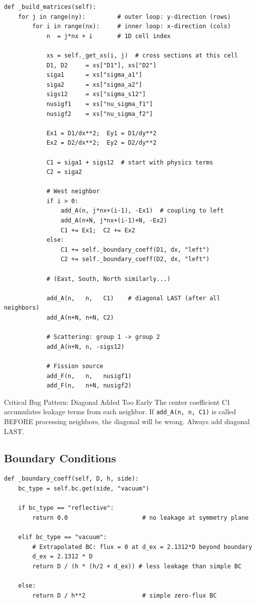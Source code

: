\documentclass[12pt,a4paper]{article}
\begin{document}
\begin{lstlisting}[caption={Matrix Assembly -- The Core of the Solver}]
def _build_matrices(self):
    for j in range(ny):         # outer loop: y-direction (rows)
        for i in range(nx):     # inner loop: x-direction (cols)
            n  = j*nx + i       # 1D cell index

            xs = self._get_xs(i, j)  # cross sections at this cell
            D1, D2     = xs["D1"], xs["D2"]
            siga1      = xs["sigma_a1"]
            siga2      = xs["sigma_a2"]
            sigs12     = xs["sigma_s12"]
            nusigf1    = xs["nu_sigma_f1"]
            nusigf2    = xs["nu_sigma_f2"]

            Ex1 = D1/dx**2;  Ey1 = D1/dy**2
            Ex2 = D2/dx**2;  Ey2 = D2/dy**2

            C1 = siga1 + sigs12  # start with physics terms
            C2 = siga2

            # West neighbor
            if i > 0:
                add_A(n, j*nx+(i-1), -Ex1)  # coupling to left
                add_A(n+N, j*nx+(i-1)+N, -Ex2)
                C1 += Ex1;  C2 += Ex2
            else:
                C1 += self._boundary_coeff(D1, dx, "left")
                C2 += self._boundary_coeff(D2, dx, "left")

            # (East, South, North similarly...)

            add_A(n,   n,   C1)    # diagonal LAST (after all neighbors)
            add_A(n+N, n+N, C2)

            # Scattering: group 1 -> group 2
            add_A(n+N, n, -sigs12)

            # Fission source
            add_F(n,   n,   nusigf1)
            add_F(n,   n+N, nusigf2)
\end{lstlisting}

\begin{warnbox}{Critical Bug Pattern: Diagonal Added Too Early}
The center coefficient C1 accumulates leakage terms from each neighbor.
If \texttt{add\_A(n, n, C1)} is called BEFORE processing neighbors,
the diagonal will be wrong. Always add diagonal LAST.
\end{warnbox}

\subsection{Boundary Conditions}

\begin{lstlisting}[caption={Extrapolated Boundary Condition}]
def _boundary_coeff(self, D, h, side):
    bc_type = self.bc.get(side, "vacuum")

    if bc_type == "reflective":
        return 0.0                     # no leakage at symmetry plane

    elif bc_type == "vacuum":
        # Extrapolated BC: flux = 0 at d_ex = 2.1312*D beyond boundary
        d_ex = 2.1312 * D
        return D / (h * (h/2 + d_ex)) # less leakage than simple BC

    else:
        return D / h**2                # simple zero-flux BC
\end{lstlisting}
\end{document}
